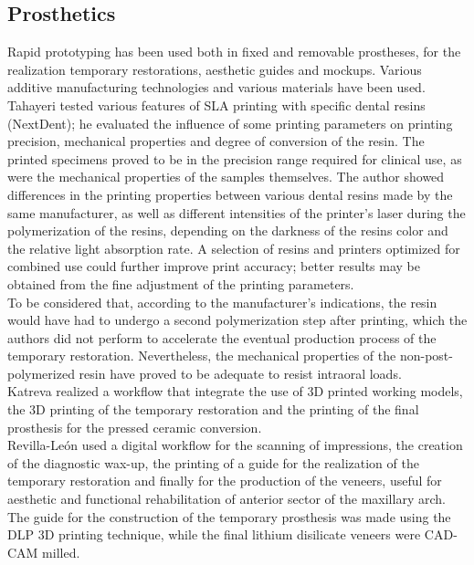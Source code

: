 \subsection{Prosthetics}
Rapid prototyping has been used both in fixed and removable prostheses, for the realization temporary restorations, aesthetic guides and mockups. Various additive manufacturing technologies and various materials have been used. \\
Tahayeri \parencite{Reference98} tested various features of SLA printing with specific dental resins (NextDent); he evaluated the influence of some printing parameters on printing precision, mechanical properties and degree of conversion of the resin. The printed specimens proved to be in the precision range required for clinical use, as were the mechanical properties of the samples themselves. The author showed differences in the printing properties between various dental resins made by the same manufacturer, as well as different intensities of the printer's laser during the polymerization of the resins, depending on the darkness of the resins color and the relative light absorption rate. A selection of resins and printers optimized for combined use could further improve print accuracy; better results may be obtained from the fine adjustment of the printing parameters. \\
To be considered that, according to the manufacturer's indications, the resin would have had to undergo a second polymerization step after printing, which the authors did not perform to accelerate the eventual production process of the temporary restoration. Nevertheless, the mechanical properties of the non-post-polymerized resin have proved to be adequate to resist intraoral loads. \\
Katreva \parencite{Reference99} realized a workflow that integrate the use of 3D printed working models, the 3D printing of the temporary restoration and the printing of the final prosthesis for the pressed ceramic conversion. \\
Revilla-León \parencite{Reference100} used a digital workflow for the scanning of impressions, the creation of the diagnostic wax-up, the printing of a guide for the realization of the temporary restoration and finally for the production of the veneers, useful for aesthetic and functional rehabilitation of anterior sector of the maxillary arch. The guide for the construction of the temporary prosthesis was made using the DLP 3D printing technique, while the final lithium disilicate veneers were CAD-CAM milled. \\
